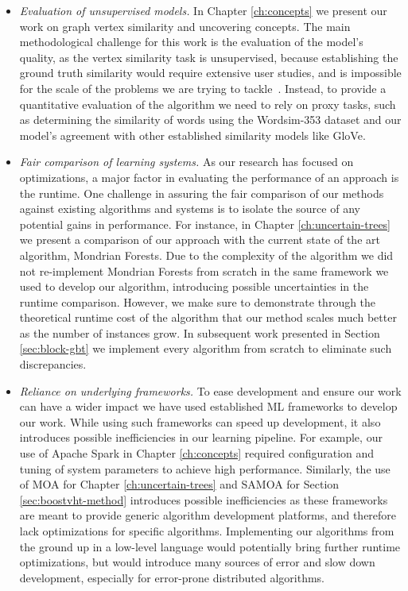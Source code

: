 \begin{itemize}
	\item \emph{Evaluation of unsupervised models.} In Chapter \ref{ch:concepts} we present our
	work on graph vertex similarity and uncovering concepts. The main methodological
	challenge for this work is the evaluation of the model's quality, as the vertex
	similarity task is unsupervised, because establishing the ground truth similarity would
	require extensive user studies, and is impossible for the scale of the problems
	we are trying to tackle~\cite{simrank}. Instead, to provide a quantitative evaluation
	of the algorithm we need to rely on proxy tasks, such as determining the similarity
	of words using the Wordsim-353 dataset \cite{wordsim} and our model's agreement
	with other established similarity models like GloVe\cite{glove}.

	\item \emph{Fair comparison of learning systems.} As our research has focused on optimizations,
	a major factor in evaluating the performance of an approach is the runtime. One challenge
	in assuring the fair comparison of our methods against existing algorithms and systems is to isolate
	the source of any potential gains in performance. For instance, in Chapter
	\ref{ch:uncertain-trees} we present a comparison of our approach with the current
	state of the art algorithm, Mondrian Forests. Due to the complexity of the algorithm
	we did not re-implement Mondrian Forests from scratch in the same framework we used to develop our
	algorithm, introducing possible uncertainties in the runtime comparison.
	However, we make sure to demonstrate through the theoretical runtime cost of the
	algorithm that our method scales much better as the number of instances grow.
	In subsequent work presented in Section \ref{sec:block-gbt} we implement every
	algorithm from scratch to eliminate such discrepancies.

	\item \emph{Reliance on underlying frameworks.} To ease development and ensure
	our work can have a wider impact we have used established ML frameworks to develop
	our work. While using such frameworks can speed up development, it also introduces possible inefficiencies
	in our learning pipeline. For example, our use of Apache Spark \cite{spark}
	in Chapter \ref{ch:concepts} required configuration and tuning of system
	parameters to achieve high performance. Similarly, the use of MOA for
	Chapter \ref{ch:uncertain-trees} and SAMOA for Section \ref{sec:boostvht-method}
	introduces possible inefficiencies as these frameworks are meant to provide
	generic algorithm development platforms, and therefore lack optimizations for specific algorithms. Implementing our algorithms from the
	ground up in a low-level language would potentially bring further runtime
	optimizations, but would introduce many sources of error and slow down development, especially
	for error-prone distributed algorithms.
\end{itemize}

